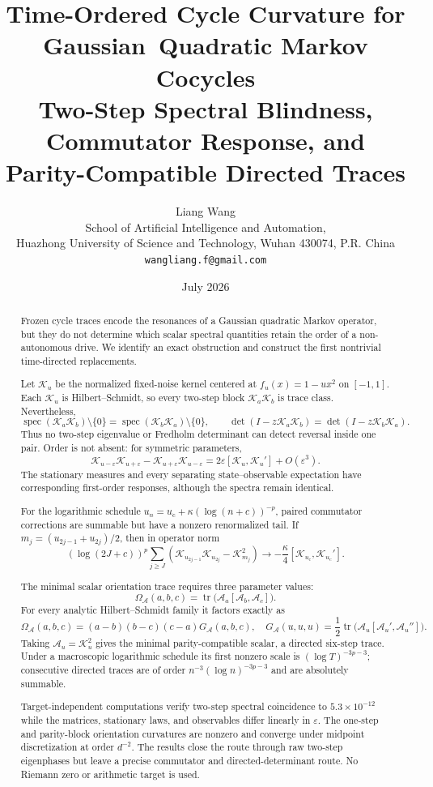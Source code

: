 \documentclass[11pt]{article}
\title{\textbf{Time-Ordered Cycle Curvature for Gaussian}\
\textbf{Quadratic Markov Cocycles}\\
\large Two-Step Spectral Blindness, Commutator Response, and\\[-0.1em]
\large Parity-Compatible Directed Traces}
\author{Liang Wang\\
\small School of Artificial Intelligence and Automation,\\[-0.2em]
\small Huazhong University of Science and Technology, Wuhan 430074, P.R. China\\
\small \texttt{wangliang.f@gmail.com}}
\date{July 2026}
\theoremstyle{definition}
\theoremstyle{remark}
\newcommand{\cK}{\mathcal K}
\newcommand{\cA}{\mathcal A}
\newcommand{\uc}{u_{\mathrm c}}
\newcommand{\spec}{\operatorname{spec}}
\newcommand{\tr}{\operatorname{tr}}
\begin{document}
\maketitle

\begin{abstract}
Frozen cycle traces encode the resonances of a Gaussian quadratic Markov
operator, but they do not determine which scalar spectral quantities retain
the order of a non-autonomous drive.  We identify an exact obstruction and
construct the first nontrivial time-directed replacements.

Let $\cK_u$ be the normalized fixed-noise kernel centered at
$f_u(x)=1-u x^2$ on $[-1,1]$.  Each $\cK_u$ is Hilbert--Schmidt, so every
two-step block $\cK_a\cK_b$ is trace class.  Nevertheless,
\[
 \spec(\cK_a\cK_b)\setminus\{0\}
 =\spec(\cK_b\cK_a)\setminus\{0\},
 \qquad
 \det(I-z\cK_a\cK_b)=\det(I-z\cK_b\cK_a).
\]
Thus no two-step eigenvalue or Fredholm determinant can detect reversal inside
one pair.  Order is not absent: for symmetric parameters,
\[
 \cK_{u-\varepsilon}\cK_{u+\varepsilon}
 -\cK_{u+\varepsilon}\cK_{u-\varepsilon}
 =2\varepsilon[\cK_u,\cK_u']+O(\varepsilon^3).
\]
The stationary measures and every separating state--observable expectation
have corresponding first-order responses, although the spectra remain
identical.

For the logarithmic schedule
$u_n=\uc+\kappa(\log(n+c))^{-p}$, paired commutator corrections are summable
but have a nonzero renormalized tail.  If $m_j=(u_{2j-1}+u_{2j})/2$, then in
operator norm
\[
 (\log(2J+c))^p\sum_{j\ge J}
 \left(\cK_{u_{2j-1}}\cK_{u_{2j}}-\cK_{m_j}^2\right)
 \longrightarrow-\frac{\kappa}{4}[\cK_{\uc},\cK_{\uc}'].
\]

The minimal scalar orientation trace requires three parameter values:
\[
 \Omega_{\cA}(a,b,c)
 =\tr\bigl(\cA_a[\cA_b,\cA_c]\bigr).
\]
For every analytic Hilbert--Schmidt family it factors exactly as
\[
 \Omega_{\cA}(a,b,c)
 =(a-b)(b-c)(c-a)G_{\cA}(a,b,c),
 \quad
 G_{\cA}(u,u,u)=\frac12\tr\bigl(\cA_u[\cA_u',\cA_u'']\bigr).
\]
Taking $\cA_u=\cK_u^2$ gives the minimal parity-compatible scalar, a directed
six-step trace.  Under a macroscopic logarithmic schedule its first nonzero
scale is $(\log T)^{-3p-3}$; consecutive directed traces are of order
$n^{-3}(\log n)^{-3p-3}$ and are absolutely summable.

Target-independent computations verify two-step spectral coincidence to
$5.3\times10^{-12}$ while the matrices, stationary laws, and observables
differ linearly in $\varepsilon$.  The one-step and parity-block orientation
curvatures are nonzero and converge under midpoint discretization at order
$d^{-2}$.  The results close the route through raw two-step eigenphases but
leave a precise commutator and directed-determinant route.  No Riemann zero or
arithmetic target is used.
\end{abstract}
\end{document}
